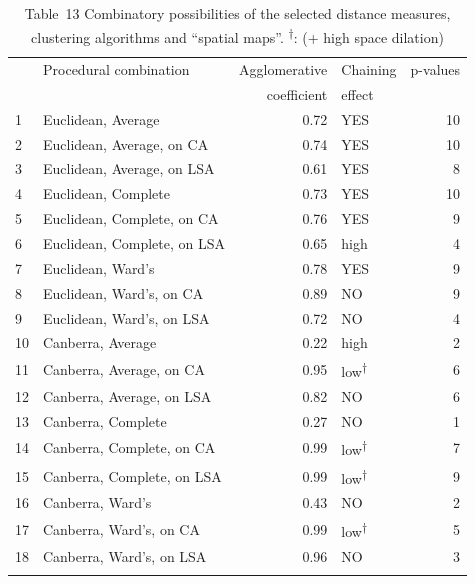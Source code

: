 \begin{table}\caption{Table~13  Combinatory possibilities of the selected distance measures, clustering algorithms and ``spatial maps''. \textsuperscript{†}: (+ high space dilation)\label{tab:key:}}
\begin{tabular}{llrlr} 
\lsptoprule
&  Procedural combination &  Agglomerative & {Chaining}  & {p-values}\\
&                         &  coefficient   & {effect} \\\midrule
1 & Euclidean, Average          & 0.72 & YES & 10\\
2 & Euclidean, Average, on CA   & 0.74 & YES & 10\\
3 & Euclidean, Average, on LSA  & 0.61 & YES & 8\\
4 & Euclidean, Complete         & 0.73 & YES & 10\\
5 & Euclidean, Complete, on CA  & 0.76 & YES & 9\\
6 & Euclidean, Complete, on LSA & 0.65 & high & 4\\
7 & Euclidean, Ward’s           & 0.78 & YES & 9\\
8 & Euclidean, Ward’s, on CA    & 0.89 & NO & 9\\
9 & Euclidean, Ward’s, on LSA   & 0.72 & NO & 4\\
10 & Canberra, Average          & 0.22 & high & 2\\
11 & Canberra, Average, on CA   & 0.95 & low\textsuperscript{†}  & 6\\
12 & Canberra, Average, on LSA  & 0.82 & NO & 6\\
13 & Canberra, Complete         & 0.27 & NO & 1\\
14 & Canberra, Complete, on CA  & 0.99 & low\textsuperscript{†} & 7\\
15 & Canberra, Complete, on LSA & 0.99 & low\textsuperscript{†} & 9\\
16 & Canberra, Ward’s           & 0.43 & NO & 2\\
17 & Canberra, Ward’s, on CA    & 0.99 & low\textsuperscript{†} & 5\\
18 & Canberra, Ward’s, on LSA   & 0.96 & NO & 3\\
\lspbottomrule
\end{tabular}
\end{table}

